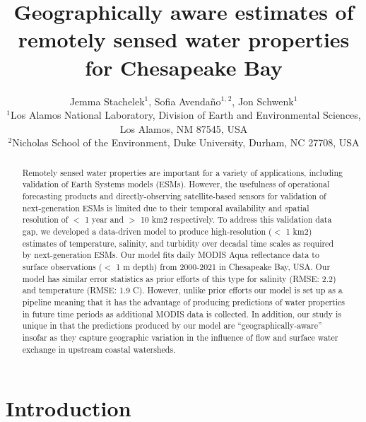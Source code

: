 \documentclass{article}
\title{Geographically aware estimates of remotely sensed water properties for Chesapeake Bay}
\author{Jemma Stachelek$^{1}$, Sofia Avendaño$^{1,}$$^{2}$, Jon Schwenk$^{1}$  \\
        \small $^{1}$Los Alamos National Laboratory, Division of Earth and Environmental Sciences, Los Alamos, NM 87545, USA \\
        \small $^{2}$Nicholas School of the Environment, Duke University, Durham, NC 27708, USA \\
}
\date{}
\begin{document}
\maketitle

\begin{abstract}
    \noindent Remotely sensed water properties are important for a variety of applications, including validation of Earth Systems models (ESMs). However, the usefulness of operational forecasting products and directly-observing satellite-based sensors for validation of next-generation ESMs is limited due to their temporal availability and spatial resolution of $<$ 1 year and $>$ 10 km2 respectively. To address this validation data gap, we developed a data-driven model to produce high-resolution ($<$ 1 km2) estimates of temperature, salinity, and turbidity over decadal time scales as required by next-generation ESMs. Our model fits daily MODIS Aqua reflectance data to surface observations ($<$ 1 m depth) from 2000-2021 in Chesapeake Bay, USA. Our model has similar error statistics as prior efforts of this type for salinity (RMSE: 2.2) and temperature (RMSE: 1.9 C). However, unlike prior efforts our model is set up as a pipeline meaning that it has the advantage of producing predictions of water properties in future time periods as additional MODIS data is collected. In addition, our study is unique in that the predictions produced by our model are “geographically-aware” insofar as they capture geographic variation in the influence of flow and surface water exchange in upstream coastal watersheds. 
    \end{abstract} \hspace{10pt}

\linenumbers

\section{Introduction}
\end{document}
